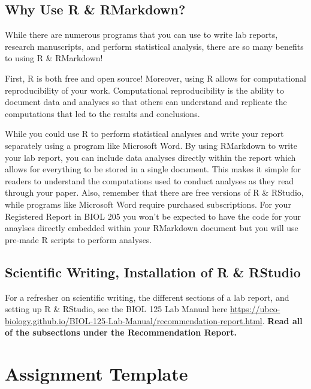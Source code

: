 \documentclass[
]{book}
\begin{document}
\hypertarget{why-use-r-rmarkdown}{%
\subsection*{Why Use R \& RMarkdown?}\label{why-use-r-rmarkdown}}

While there are numerous programs that you can use to write lab reports, research manuscripts, and perform statistical analysis, there are so many benefits to using R \& RMarkdown!

First, R is both free and open source! Moreover, using R allows for computational reproducibility of your work. Computational reproducibility is the ability to document data and analyses so that others can understand and replicate the computations that led to the results and conclusions.

While you could use R to perform statistical analyses and write your report separately using a program like Microsoft Word. By using RMarkdown to write your lab report, you can include data analyses directly within the report which allows for everything to be stored in a single document. This makes it simple for readers to understand the computations used to conduct analyses as they read through your paper. Also, remember that there are free versions of R \& RStudio, while programs like Microsoft Word require purchased subscriptions. For your Registered Report in BIOL 205 you won't be expected to have the code for your anaylses directly embedded within your RMarkdown document but you will use pre-made R scripts to perform analyses.

\hypertarget{scientific-writing-installation-of-r-rstudio}{%
\subsection*{Scientific Writing, Installation of R \& RStudio}\label{scientific-writing-installation-of-r-rstudio}}

For a refresher on scientific writing, the different sections of a lab report, and setting up R \& RStudio, see the BIOL 125 Lab Manual here \url{https://ubco-biology.github.io/BIOL-125-Lab-Manual/recommendation-report.html}. \textbf{Read all of the subsections under the Recommendation Report.}

\hypertarget{assignment-template}{%
\section*{Assignment Template}\label{assignment-template}}
\end{document}
